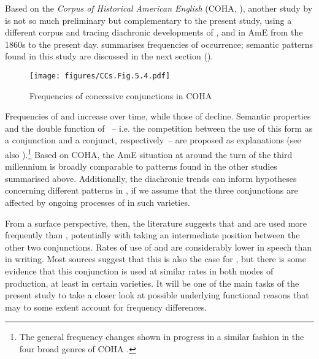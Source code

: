 Based on the \textit{Corpus of Historical American English} (COHA, \citealt{Davies2010}), another study by \citet{Schützler2018b} is not so much preliminary but complementary to the present study, using a different corpus and tracing diachronic developments of ,  and  in AmE from the 1860s to the present day.  summarises frequencies of occurrence; semantic patterns found in this study are discussed in the next section ().

\begin{figure}
\texttt{[image: figures/CCs.Fig.5.4.pdf]}
\caption{\label{bkm:Ref35585292}\label{fig:5.4}Frequencies of concessive conjunctions in COHA \citep[205]{Schützler2018b}}
 \end{figure}

Frequencies of  and  increase over time, while those of  decline. Semantic properties and the double function of ~– i.e. the competition between the use of this form as a conjunction and a conjunct, respectively~– are proposed as explanations (see also \citealt{Schützler2020a}).\footnote{The general frequency changes shown in  progress in a similar fashion in the four broad genres of COHA \citep[207]{Schützler2018b}.} Based on COHA, the AmE situation at around the turn of the third millennium is broadly comparable to patterns found in the other studies summarised above. Additionally, the diachronic trends can inform hypotheses concerning different patterns in , if we assume that the three conjunctions are affected by ongoing processes of  in such varieties.

  From a surface perspective, then, the literature suggests that  and  are used more frequently than , potentially with  taking an intermediate position between the other two conjunctions. Rates of use of  and  are considerably lower in speech than in writing. Most sources suggest that this is also the case for , but there is some evidence that this conjunction is used at similar rates in both modes of production, at least in certain varieties. It will be one of the main tasks of the present study to take a closer look at possible underlying functional reasons that may to some extent account for frequency differences.

